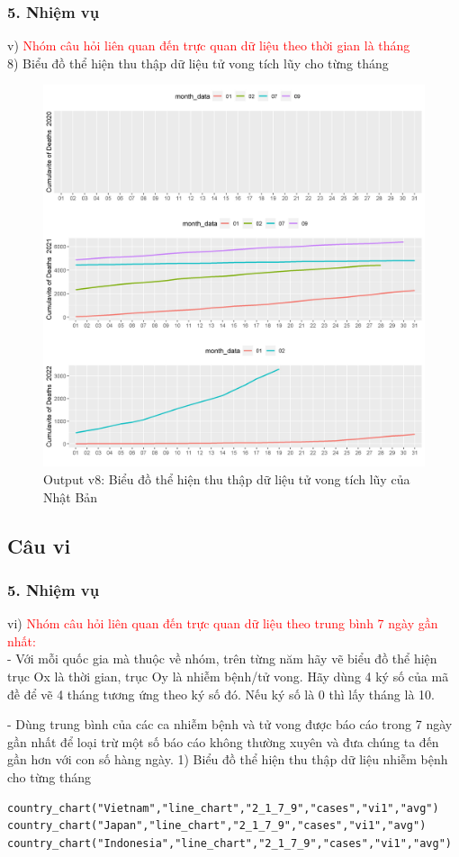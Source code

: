 \documentclass[english,10pt,table]{beamer}
\begin{document}
\begin{frame}[fragile]
\frametitle{5.  Nhiệm vụ}
v) \textcolor{red}{Nhóm câu hỏi liên quan đến trực quan dữ liệu theo thời gian là tháng}\\
    8) Biểu đồ thể hiện thu thập dữ liệu tử vong tích lũy cho từng tháng
	\begin{figure}[h!]
	\begin{center}
		    \includegraphics[scale = 0.26]{Images/V/v8 Japan .jpeg}
		     \caption{Output v8: Biểu đồ thể hiện thu thập dữ liệu tử vong tích lũy của Nhật Bản}
		\end{center}
		\end{figure}
\end{frame}

\subsection{Câu vi}
\begin{frame}[fragile]
\frametitle{5.  Nhiệm vụ}
vi) \textcolor{red}{Nhóm câu hỏi liên quan đến trực quan dữ liệu theo trung bình 7 ngày gần nhất:}\\
- Với mỗi quốc gia mà thuộc về nhóm, trên từng năm hãy vẽ biểu đồ thể hiện trục Ox là thời gian, trục Oy là nhiễm bệnh/tử vong. Hãy dùng 4 ký số của mã đề để vẽ 4 tháng tương ứng theo ký số đó. Nếu ký số là 0 thì lấy tháng là 10.

- Dùng trung bình của các ca nhiễm bệnh và tử vong được báo cáo trong 7 ngày gần nhất để loại trừ một số báo cáo không thường xuyên và đưa chúng ta đến gần hơn với con số hàng ngày.
    1) Biểu đồ thể hiện thu thập dữ liệu nhiễm bệnh cho từng tháng
    \begin{lstlisting}[frame=single,basicstyle=\tiny]  
country_chart("Vietnam","line_chart","2_1_7_9","cases","vi1","avg")
country_chart("Japan","line_chart","2_1_7_9","cases","vi1","avg")
country_chart("Indonesia","line_chart","2_1_7_9","cases","vi1","avg")
		\end{lstlisting}	
\end{frame}
\end{document}
